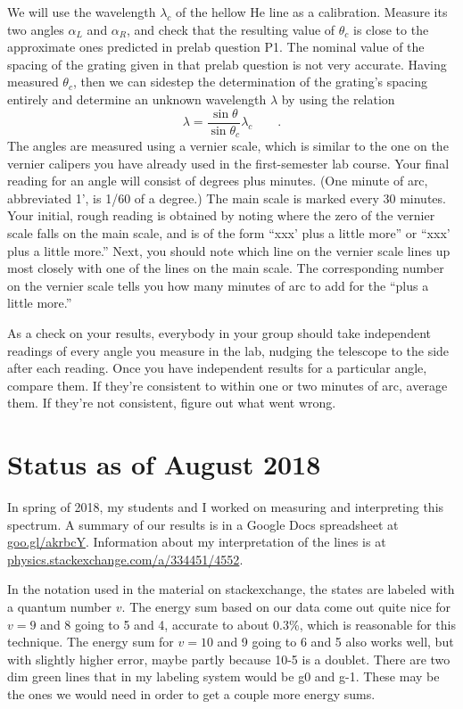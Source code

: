 We will use the wavelength $\lambda_c$ of the hellow He line as a calibration. Measure its two
angles $\alpha_L$ and $\alpha_R$, and check that the resulting value of $\theta_c$ is
close to the approximate ones predicted in prelab question P1. The nominal value of the
spacing of the grating given in that prelab question is not very accurate.
Having measured $\theta_c$,
then we can sidestep the determination of the grating's spacing entirely 
and determine an unknown wavelength $\lambda$
by using the relation
\begin{equation*}
  \lambda = \frac{\sin\theta}{\sin\theta_c} \lambda_c \qquad .
\end{equation*}
The angles are measured using a vernier scale, which
is similar to the one on the vernier calipers you have
already used in the first-semester lab course. Your final
reading for an angle will consist of degrees plus minutes.
(One minute of arc, abbreviated 1', is 1/60 of a degree.)
The main scale is marked every 30 minutes. Your initial,
rough reading is obtained by noting where the zero of the
vernier scale falls on the main scale, and is of the form
``xxx' plus a little more'' or ``xxx'
plus a little more.'' Next, you should note which line on
the vernier scale lines up most closely with one of the
lines on the main scale. The corresponding number on the
vernier scale tells you how many minutes of arc to add for
the ``plus a little more.''

As a check on your results,
everybody in your group should take independent readings of every
angle you measure in the lab, nudging the telescope to the side after
each reading. Once you have independent results for a particular angle,
compare them. If they're consistent to within one or two minutes of
arc, average them. If they're not consistent, figure out what went
wrong.

\section*{Status as of August 2018}

In spring of 2018, my students and I worked on measuring and
interpreting this spectrum. A summary of our results is in a Google
Docs spreadsheet at \url{goo.gl/akrbcY}.  Information about my
interpretation of the lines is at\\
\url{physics.stackexchange.com/a/334451/4552}.

In the notation used in the material on stackexchange, the states are
labeled with a quantum number $v$.  The energy sum based on our data
come out quite nice for $v=9$ and 8 going to 5 and 4, accurate to
about 0.3\%, which is reasonable for this technique.  The energy sum
for $v=10$ and 9 going to 6 and 5 also works well, but with slightly
higher error, maybe partly because 10-5 is a doublet.  There are two
dim green lines that in my labeling system would be g0 and g-1.
These may be the
ones we would need in order to get a couple more energy sums.

